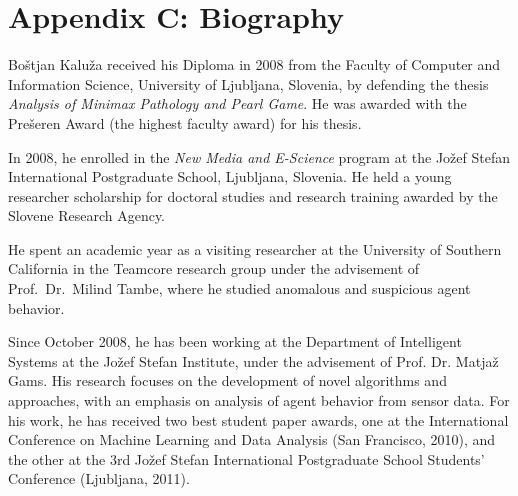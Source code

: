
\chapter*{\vspace{-2.3cm} \Large Appendix C: Biography \vspace{1.7cm}}

\fancyhead[LO]{}

Bo{\v s}tjan Kalu{\v z}a received his Diploma in 2008 from the Faculty of Computer and Information Science, University of Ljubljana, Slovenia, by defending the thesis \textit{Analysis of Minimax Pathology and Pearl Game}. He was awarded with the Pre{\v s}eren Award (the highest faculty award) for his thesis.

In 2008, he enrolled in the \textit{New Media and E-Science} program at the Jo\v{z}ef Stefan International Postgraduate School, Ljubljana, Slovenia. He held a young researcher scholarship for doctoral studies and research training awarded by the Slovene Research Agency.

He spent an academic year as a visiting researcher at the University of Southern California in the Teamcore research group under the advisement of Prof.\ Dr.\ Milind Tambe, where he studied anomalous and suspicious agent behavior.

Since October 2008, he has been working at the Department of Intelligent Systems at the Jo\v{z}ef Stefan Institute, under the advisement of Prof. Dr. Matja\v{z} Gams. His research focuses on the development of novel algorithms and approaches, with an emphasis on %
analysis of agent behavior from sensor data. For his work, he has received two best student paper awards, one at the International Conference on Machine Learning and Data Analysis (San Francisco, 2010), and the other at the 3rd Jo\v{z}ef Stefan International Postgraduate School Students' Conference (Ljubljana, 2011).
